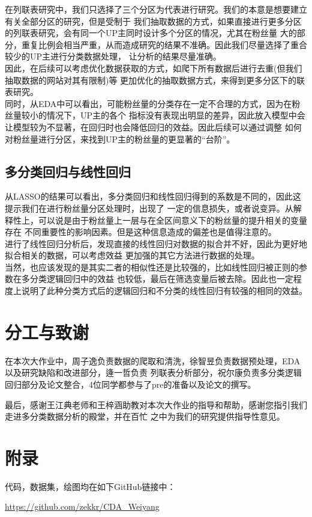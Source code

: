 \documentclass{ctexart}
\begin{document}
在列联表研究中，我们只选择了三个分区为代表进行研究。我们的本意是想要建立有关全部分区的研究，但是受制于
我们抽取数据的方式，如果直接进行更多分区的列联表研究，会有同一个UP主同时设计多个分区的情况，尤其在粉丝量
大的部分，重复比例会相当严重，从而造成研究的结果不准确。因此我们尽量选择了重合较少的UP主进行分类数据处理，
让分析的结果尽量准确。\\
\indent 因此，在后续可以考虑优化数据获取的方式，如爬下所有数据后进行去重(但我们抽取数据的网站对其有限制)等
更加优化的抽取数据方式，来得到更多分区下的联表研究。\\
\indent 同时，从EDA中可以看出，可能粉丝量的分类存在一定不合理的方式，因为在粉丝量较小的情况下，UP主的各个
指标没有表现出明显的差异，因此放入模型中会让模型较为不显著，在回归时也会降低回归的效益。因此后续可以通过调整
如何对粉丝量进行分区，来找到UP主的粉丝量的更显著的“台阶”。

\subsection{多分类回归与线性回归}
从LASSO的结果可以看出，多分类回归和线性回归得到的系数是不同的，因此这提示我们在进行粉丝量分区处理时，出现了
一定的信息损失，或者说变异。从解释性上，可以说是由于粉丝量上一层与在全区间意义下的粉丝量的提升相关的变量存在
不同重要性的影响因素。但是这种信息造成的偏差也是值得注意的。\\
\indent 进行了线性回归分析后，发现直接的线性回归对数据的拟合并不好，因此为更好地拟合相关的数据，可以考虑效益
更加强的其它方法进行数据的处理。\\
\indent 当然，也应该发现的是其实二者的相似性还是比较强的，比如线性回归被正则的参数在多分类逻辑回归中的效益
也较低，最后在筛选变量后被去除。因此也一定程度上说明了此种分类方式后的逻辑回归和不分类的线性回归有较强的相同的效益。

\section*{分工与致谢}

在本次大作业中，周子逸负责数据的爬取和清洗，徐智昱负责数据预处理，EDA以及研究缺陷和改进部分，逄一哲负责
列联表分析部分，祝尔康负责多分类逻辑回归部分及论文整合，4位同学都参与了pre的准备以及论文的撰写。

最后，感谢王江典老师和王梓涵助教对本次大作业的指导和帮助，感谢您指引我们走进多分类数据分析的殿堂，并在百忙
之中为我们的研究提供指导性意见。

\section*{附录}

代码，数据集，绘图均在如下GitHub链接中：

\href{https://github.com/zekkr/CDA\_Weiyang}{https://github.com/zekkr/CDA\_Weiyang}
\end{document}

